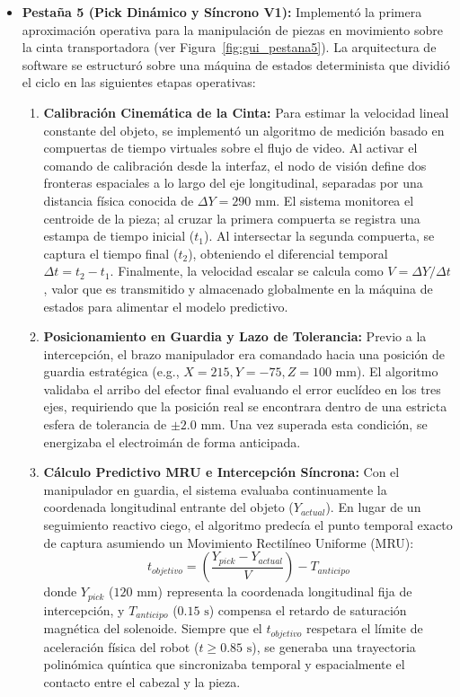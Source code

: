 \documentclass[12pt, a4paper]{report}
\begin{document}
\begin{itemize}
    \item \textbf{Pestaña 5 (Pick Dinámico y Síncrono V1):} Implementó la primera aproximación operativa para la manipulación de piezas en movimiento sobre la cinta transportadora (ver Figura~\ref{fig:gui_pestana5}). La arquitectura de software se estructuró sobre una máquina de estados determinista que dividió el ciclo en las siguientes etapas operativas:
    \begin{enumerate}
        \item \textbf{Calibración Cinemática de la Cinta:} Para estimar la velocidad lineal constante del objeto, se implementó un algoritmo de medición basado en compuertas de tiempo virtuales sobre el flujo de video. Al activar el comando de calibración desde la interfaz, el nodo de visión define dos fronteras espaciales a lo largo del eje longitudinal, separadas por una distancia física conocida de $\Delta Y = 290\text{ mm}$. El sistema monitorea el centroide de la pieza; al cruzar la primera compuerta se registra una estampa de tiempo inicial ($t_1$). Al intersectar la segunda compuerta, se captura el tiempo final ($t_2$), obteniendo el diferencial temporal $\Delta t = t_2 - t_1$. Finalmente, la velocidad escalar se calcula como $V = \Delta Y / \Delta t$, valor que es transmitido y almacenado globalmente en la máquina de estados para alimentar el modelo predictivo.
        
        \item \textbf{Posicionamiento en Guardia y Lazo de Tolerancia:} Previo a la intercepción, el brazo manipulador era comandado hacia una posición de guardia estratégica (e.g., $X=215, Y=-75, Z=100\text{ mm}$). El algoritmo validaba el arribo del efector final evaluando el error euclídeo en los tres ejes, requiriendo que la posición real se encontrara dentro de una estricta esfera de tolerancia de $\pm2.0\text{ mm}$. Una vez superada esta condición, se energizaba el electroimán de forma anticipada.
        
        \item \textbf{Cálculo Predictivo MRU e Intercepción Síncrona:} Con el manipulador en guardia, el sistema evaluaba continuamente la coordenada longitudinal entrante del objeto ($Y_{actual}$). En lugar de un seguimiento reactivo ciego, el algoritmo predecía el punto temporal exacto de captura asumiendo un Movimiento Rectilíneo Uniforme (MRU): 
        \begin{equation}
            t_{objetivo} = \left( \frac{Y_{pick} - Y_{actual}}{V} \right) - T_{anticipo}
        \end{equation}
        donde $Y_{pick}$ ($120\text{ mm}$) representa la coordenada longitudinal fija de intercepción, y $T_{anticipo}$ ($0.15\text{ s}$) compensa el retardo de saturación magnética del solenoide. Siempre que el $t_{objetivo}$ respetara el límite de aceleración física del robot ($t \ge 0.85\text{ s}$), se generaba una trayectoria polinómica quíntica que sincronizaba temporal y espacialmente el contacto entre el cabezal y la pieza.
    \end{enumerate}


\end{itemize}
\end{document}
